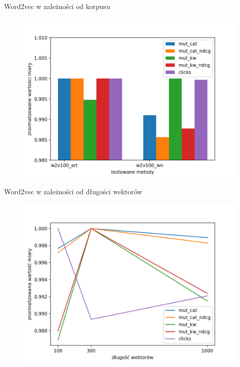 \documentclass{beamer}
\begin{document}
	\begin{frame}{Word2vec w zależności od korpusu}
		\begin{figure}[H]
			\centering
			\includegraphics[width=1\textwidth]{img/results/w2v100_art_w2v100_wn_.png}
		\end{figure}
	\end{frame}
	\begin{frame}{Word2vec w zależności od długości wektorów}
		\begin{figure}[H]
			\centering
			\includegraphics[width=1\textwidth]{img/results/w2v_ctr.png}
		\end{figure}
	\end{frame}
\end{document}
